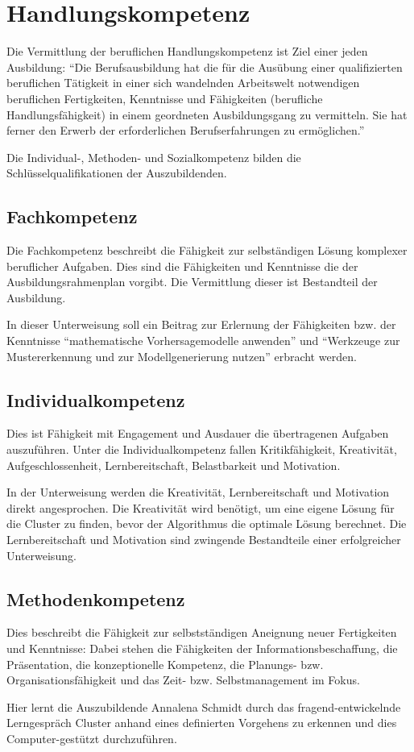 \chapter{Handlungskompetenz}
Die Vermittlung der beruflichen Handlungskompetenz ist Ziel einer jeden Ausbildung: \enquote{Die Berufsausbildung hat die für die Ausübung einer qualifizierten beruflichen Tätigkeit in einer sich wandelnden Arbeitswelt notwendigen beruflichen Fertigkeiten, Kenntnisse und Fähigkeiten (berufliche Handlungsfähigkeit) in einem geordneten Ausbildungsgang zu vermitteln. Sie hat ferner den Erwerb der erforderlichen Berufserfahrungen zu ermöglichen.}\autocite[][§1\,III BBiG]{berufsbildungsgesetz_bbig_bbig_nodate} 
\par
Die Individual-, Methoden- und Sozialkompetenz bilden die Schlüsselqualifikationen der Auszubildenden. 

\section{Fachkompetenz}
Die Fachkompetenz beschreibt die Fähigkeit zur selbständigen Lösung komplexer beruflicher Aufgaben. Dies sind die Fähigkeiten und Kenntnisse die der Ausbildungsrahmenplan vorgibt. Die Vermittlung dieser ist Bestandteil der Ausbildung. 
\par
In dieser Unterweisung soll ein Beitrag zur Erlernung der Fähigkeiten bzw. der Kenntnisse \enquote{mathematische Vorhersagemodelle anwenden} und \enquote{Werkzeuge zur Mustererkennung und zur Modellgenerierung nutzen} erbracht werden.

\section{Individualkompetenz}
Dies ist Fähigkeit mit Engagement und Ausdauer die übertragenen Aufgaben auszuführen. Unter die Individualkompetenz fallen Kritikfähigkeit, Kreativität, Aufgeschlossenheit,  Lernbereitschaft, Belastbarkeit und Motivation.
\par
In der Unterweisung werden die Kreativität, Lernbereitschaft und Motivation direkt angesprochen. Die Kreativität wird benötigt, um eine eigene Lösung für die Cluster zu finden, bevor der Algorithmus die optimale Lösung berechnet. Die Lernbereitschaft und Motivation sind zwingende Bestandteile einer erfolgreicher Unterweisung. 

\section{Methodenkompetenz}
Dies beschreibt die Fähigkeit zur selbstständigen Aneignung neuer Fertigkeiten und Kenntnisse: Dabei stehen die Fähigkeiten der Informationsbeschaffung, die Präsentation, die konzeptionelle Kompetenz, die Planungs- bzw. Organisationsfähigkeit und das Zeit- bzw. Selbstmanagement im Fokus.
\par
Hier lernt die Auszubildende Annalena Schmidt durch das fragend-entwickelnde Lerngespräch Cluster anhand eines definierten Vorgehens zu erkennen und dies Computer-gestützt durchzuführen.

